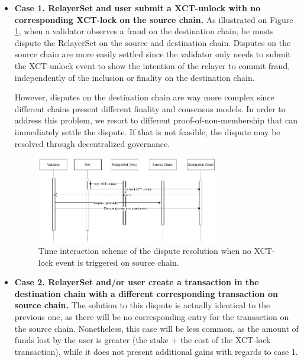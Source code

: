     \begin{itemize}
        \item \textbf{Case 1. RelayerSet and user submit a XCT-unlock with no corresponding XCT-lock on the source chain.}
        As illustrated on Figure \ref{fig:dispute1}, when a validator observes a fraud on the destination chain, he musts dispute the RelayerSet on the source and destination chain. Disputes on the source chain are more easily settled since the validator only needs to submit the XCT-unlock event to show the intention of the relayer to commit fraud, independently of the inclusion or finality on the destination chain. 
        
        However, disputes on the destination chain are way more complex since different chains present different finality and consensus models. In order to address this problem, we resort to different proof-of-non-membership that can immediately settle the dispute. If that is not feasible, the dispute may be resolved through decentralized governance.
        
        \begin{figure}[h]
            \centering
            \includegraphics[width=0.75\textwidth]{images/mosaic/phase3/dispute1.png}
            \caption{Time interaction scheme of the dispute resolution when no XCT-lock event is triggered on source chain.}
            \label{fig:dispute1}
        \end{figure}
        
        
        \item \textbf{Case 2. RelayerSet and/or user create a transaction in the destination chain with a different corresponding transaction on source chain.}
        The solution to this dispute is actually identical to the previous one, as there will be no corresponding entry for the transaction on the source chain. Nonetheless, this case will be less common, as the amount of funds lost by the user is greater (the stake + the cost of the XCT-lock transaction), while it does not present additional gains with regards to case 1.
        

\end{itemize}
